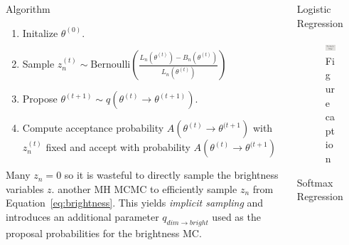 \documentclass[final]{beamer}
\newlength{\onecolwid}
\newlength{\twocolwid}
\begin{document}
\begin{frame}[t]
\begin{columns}[t]
\begin{column}{\twocolwid}
\begin{columns}[t,totalwidth=\twocolwid]
\begin{column}{\onecolwid}
\begin{block}{Algorithm}
\begin{enumerate}
  \item Initalize $\theta^{(0)}$.
  \item Sample $z^{(t)}_n \sim \text{Bernoulli}\left(
    \frac{L_n(\theta^{(t)}) - B_n(\theta^{(t)})}{L_n(\theta^{(t)})}
    \right)$
  \item Propose $\theta^{(t+1)} \sim q(\theta^{(t)} \to \theta^{(t+1)})$.
  \item Compute acceptance probability $A(\theta^{(t)} \to \theta^{(t+1})$
    with $z^{(t)}_n$ fixed and accept with probability $A(\theta^{(t)} \to \theta^{(t+1})$
\end{enumerate}

Many $z_n = 0$ so it is wasteful to directly sample the brightness variables
$z$. another MH MCMC to efficiently sample $z_n$ from
Equation~\ref{eq:brightness}. This yields \emph{implicit sampling} and
introduces an additional parameter $q_{dim \to bright}$ used as the proposal
probabilities for the brightness MC.

\end{block}

\end{column} %

\begin{column}{\onecolwid}\vspace{-.6in} %

\begin{block}{Logistic Regression}

\begin{figure}
\includegraphics[width=0.8\linewidth]{placeholder.jpg}
\caption{Figure caption}
\end{figure}

\end{block}


\begin{block}{Softmax Regression}


\end{block}
\end{column}
\end{columns}
\end{column}
\end{columns}
\end{frame}
\end{document}
